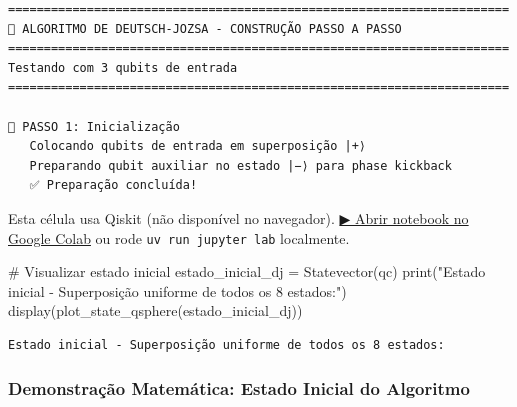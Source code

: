 \documentclass[
  brazilian,
]{report}
\newenvironment{Shaded}{\begin{snugshade}}{\end{snugshade}}
\newcommand{\BuiltInTok}[1]{\textcolor[rgb]{0.00,0.23,0.31}{#1}}
\newcommand{\CommentTok}[1]{\textcolor[rgb]{0.37,0.37,0.37}{#1}}
\newcommand{\NormalTok}[1]{\textcolor[rgb]{0.00,0.23,0.31}{#1}}
\newcommand{\OperatorTok}[1]{\textcolor[rgb]{0.37,0.37,0.37}{#1}}
\newcommand{\StringTok}[1]{\textcolor[rgb]{0.13,0.47,0.30}{#1}}
\begin{document}
\begin{verbatim}
======================================================================
🎯 ALGORITMO DE DEUTSCH-JOZSA - CONSTRUÇÃO PASSO A PASSO
======================================================================
Testando com 3 qubits de entrada
======================================================================

📍 PASSO 1: Inicialização
   Colocando qubits de entrada em superposição |+⟩
   Preparando qubit auxiliar no estado |−⟩ para phase kickback
   ✅ Preparação concluída!
\end{verbatim}

\begin{tcolorbox}[enhanced jigsaw, arc=.35mm, bottomrule=.15mm, bottomtitle=1mm, breakable, colback=white, colbacktitle=quarto-callout-warning-color!10!white, colframe=quarto-callout-warning-color-frame, coltitle=black, left=2mm, leftrule=.75mm, opacityback=0, opacitybacktitle=0.6, rightrule=.15mm, title=\textcolor{quarto-callout-warning-color}{\faExclamationTriangle}\hspace{0.5em}{⚛️ Célula Qiskit --- execute no Colab ou localmente}, titlerule=0mm, toprule=.15mm, toptitle=1mm]

Esta célula usa Qiskit (não disponível no navegador).
\href{https://colab.research.google.com/github/maxwellamaral/aula-quantum/blob/main/notebooks/05-interference.ipynb}{▶
Abrir notebook no Google Colab} ou rode \texttt{uv\ run\ jupyter\ lab}
localmente.

\begin{Shaded}
\begin{Highlighting}[]

\CommentTok{\# Visualizar estado inicial}
\NormalTok{estado\_inicial\_dj }\OperatorTok{=}\NormalTok{ Statevector(qc)}
\BuiltInTok{print}\NormalTok{(}\StringTok{"Estado inicial {-} Superposição uniforme de todos os 8 estados:"}\NormalTok{)}
\NormalTok{display(plot\_state\_qsphere(estado\_inicial\_dj))}
\end{Highlighting}
\end{Shaded}

\end{tcolorbox}

\begin{verbatim}
Estado inicial - Superposição uniforme de todos os 8 estados:
\end{verbatim}

\subsubsection{Demonstração Matemática: Estado Inicial do
Algoritmo}\label{demonstrauxe7uxe3o-matemuxe1tica-estado-inicial-do-algoritmo}
\end{document}
